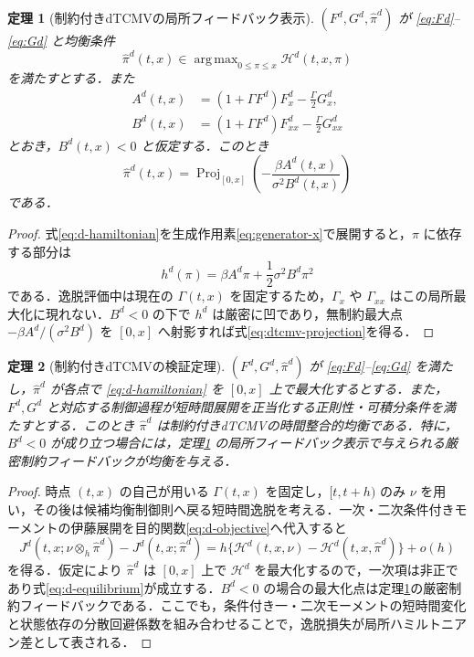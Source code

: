 \documentclass[10pt,a4paper]{article}
\theoremstyle{plain}
\newtheorem{theorem}{定理}
\theoremstyle{definition}
\DeclareMathOperator{\Proj}{Proj}
\DeclareMathOperator*{\argmax}{arg\,max}
\newcommand{\Hamil}{\mathcal{H}}
\begin{document}
\begin{theorem}[制約付きdTCMVの局所フィードバック表示]
\label{thm:dtcmv-projection}
$(F^d,G^d,\hat\pi^d)$ が \eqref{eq:Fd}--\eqref{eq:Gd} と均衡条件
\begin{equation}
  \hat\pi^d(t,x)\in\argmax_{0\leq\pi\leq x}\Hamil^d(t,x,\pi)
  \label{eq:d-argmax}
\end{equation}
を満たすとする．また
\begin{align}
  A^d(t,x)&=(1+\Gamma F^d)F_x^d-\frac{\Gamma}{2}G_x^d,
  \label{eq:Ad}\\
  B^d(t,x)&=(1+\Gamma F^d)F_{xx}^d-\frac{\Gamma}{2}G_{xx}^d
  \label{eq:Bd}
\end{align}
とおき，$B^d(t,x)<0$ と仮定する．このとき
\begin{equation}
  \boxed{
  \hat\pi^d(t,x)=
  \Proj_{[0,x]}
  \left(
  -\frac{\beta A^d(t,x)}{\sigma^2B^d(t,x)}
  \right)
  }
  \label{eq:dtcmv-projection}
\end{equation}
である．
\end{theorem}

\begin{proof}
式\eqref{eq:d-hamiltonian}を生成作用素\eqref{eq:generator-x}で展開すると，$\pi$ に依存する部分は
\[
 h^d(\pi)=\beta A^d\pi+\frac12\sigma^2B^d\pi^2
\]
である．逸脱評価中は現在の $\Gamma(t,x)$ を固定するため，$\Gamma_x$ や $\Gamma_{xx}$ はこの局所最大化に現れない．$B^d<0$ の下で $h^d$ は厳密に凹であり，無制約最大点 $-\beta A^d/(\sigma^2B^d)$ を $[0,x]$ へ射影すれば式\eqref{eq:dtcmv-projection}を得る．
\end{proof}

\begin{theorem}[制約付きdTCMVの検証定理]
\label{thm:dtcmv-verification}
$(F^d,G^d,\hat\pi^d)$ が \eqref{eq:Fd}--\eqref{eq:Gd} を満たし，$\hat\pi^d$ が各点で \eqref{eq:d-hamiltonian} を $[0,x]$ 上で最大化するとする．また，$F^d,G^d$ と対応する制御過程が短時間展開を正当化する正則性・可積分条件を満たすとする．このとき $\hat\pi^d$ は制約付きdTCMVの時間整合的均衡である．特に，$B^d<0$ が成り立つ場合には，定理\ref{thm:dtcmv-projection} の局所フィードバック表示で与えられる厳密制約フィードバックが均衡を与える．
\end{theorem}

\begin{proof}
時点 $(t,x)$ の自己が用いる $\Gamma(t,x)$ を固定し，$[t,t+h)$ のみ $\nu$ を用い，その後は候補均衡制御則へ戻る短時間逸脱を考える．一次・二次条件付きモーメントの伊藤展開を目的関数\eqref{eq:d-objective}へ代入すると
\[
 J^d(t,x;\nu\otimes_h\hat\pi^d)-J^d(t,x;\hat\pi^d)
 =h\{\Hamil^d(t,x,\nu)-\Hamil^d(t,x,\hat\pi^d)\}+o(h)
\]
を得る．仮定により $\hat\pi^d$ は $[0,x]$ 上で $\Hamil^d$ を最大化するので，一次項は非正であり式\eqref{eq:d-equilibrium}が成立する．$B^d<0$ の場合の最大化点は定理\ref{thm:dtcmv-projection}の厳密制約フィードバックである．ここでも，条件付き一・二次モーメントの短時間変化と状態依存の分散回避係数を組み合わせることで，逸脱損失が局所ハミルトニアン差として表される．
\end{proof}
\end{document}
